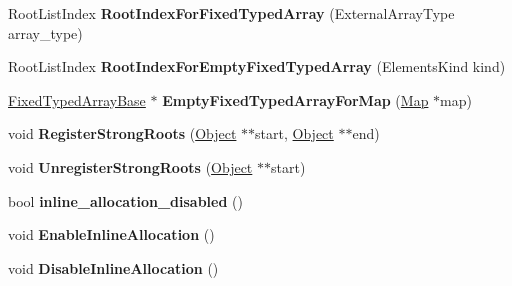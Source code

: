 \begin{DoxyCompactItemize}
\item 
Root\+List\+Index {\bfseries Root\+Index\+For\+Fixed\+Typed\+Array} (External\+Array\+Type array\+\_\+type)\hypertarget{classv8_1_1internal_1_1_heap_ab95fcc49fcf78bd5e7b43c4996d702fc}{}\label{classv8_1_1internal_1_1_heap_ab95fcc49fcf78bd5e7b43c4996d702fc}

\item 
Root\+List\+Index {\bfseries Root\+Index\+For\+Empty\+Fixed\+Typed\+Array} (Elements\+Kind kind)\hypertarget{classv8_1_1internal_1_1_heap_a169f08c734a7cee6198d41d152a865b3}{}\label{classv8_1_1internal_1_1_heap_a169f08c734a7cee6198d41d152a865b3}

\item 
\hyperlink{classv8_1_1internal_1_1_fixed_typed_array_base}{Fixed\+Typed\+Array\+Base} $\ast$ {\bfseries Empty\+Fixed\+Typed\+Array\+For\+Map} (\hyperlink{classv8_1_1internal_1_1_map}{Map} $\ast$map)\hypertarget{classv8_1_1internal_1_1_heap_a110af75c2b40c6c862217f13f4d519d8}{}\label{classv8_1_1internal_1_1_heap_a110af75c2b40c6c862217f13f4d519d8}

\item 
void {\bfseries Register\+Strong\+Roots} (\hyperlink{classv8_1_1internal_1_1_object}{Object} $\ast$$\ast$start, \hyperlink{classv8_1_1internal_1_1_object}{Object} $\ast$$\ast$end)\hypertarget{classv8_1_1internal_1_1_heap_a3afa5f88020993bed12c24ac19a51d75}{}\label{classv8_1_1internal_1_1_heap_a3afa5f88020993bed12c24ac19a51d75}

\item 
void {\bfseries Unregister\+Strong\+Roots} (\hyperlink{classv8_1_1internal_1_1_object}{Object} $\ast$$\ast$start)\hypertarget{classv8_1_1internal_1_1_heap_a64b43d5e26d96f5710d2bcc5f52362c1}{}\label{classv8_1_1internal_1_1_heap_a64b43d5e26d96f5710d2bcc5f52362c1}

\item 
bool {\bfseries inline\+\_\+allocation\+\_\+disabled} ()\hypertarget{classv8_1_1internal_1_1_heap_a5ab14424532c00f1480d186cca9cdbff}{}\label{classv8_1_1internal_1_1_heap_a5ab14424532c00f1480d186cca9cdbff}

\item 
void {\bfseries Enable\+Inline\+Allocation} ()\hypertarget{classv8_1_1internal_1_1_heap_ab1d6861599cbde5ad3aae965b6a55b3a}{}\label{classv8_1_1internal_1_1_heap_ab1d6861599cbde5ad3aae965b6a55b3a}

\item 
void {\bfseries Disable\+Inline\+Allocation} ()\hypertarget{classv8_1_1internal_1_1_heap_a95a38af1929db19530920772fb58386e}{}\label{classv8_1_1internal_1_1_heap_a95a38af1929db19530920772fb58386e}


\end{DoxyCompactItemize}
